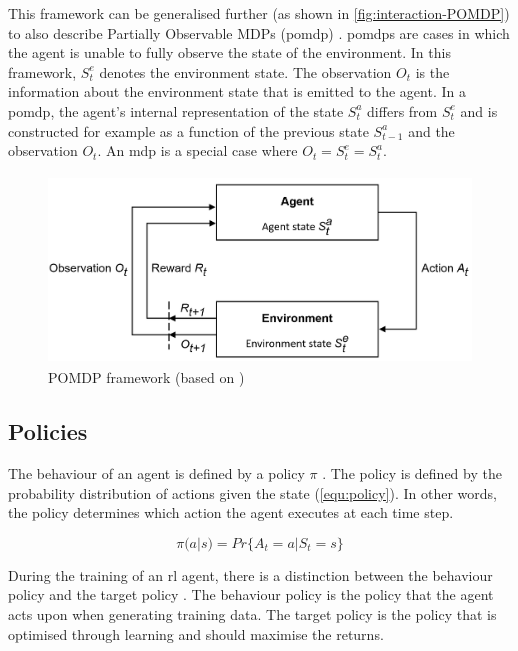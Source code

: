 This framework can be generalised further (as shown in \autoref{fig:interaction-POMDP}) to also describe Partially Observable MDPs (\gls{pomdp}) \parencite{silver2015}. \glspl{pomdp} are cases in which the agent is unable to fully observe the state of the environment.
In this framework, $S_t^e$ denotes the environment state. The observation $O_t$ is the information about the environment state that is emitted to the agent. In a \gls{pomdp}, the agent's internal representation of the state $S^a_t$ differs from $S_t^e$ and is constructed for example as a function of the previous state $S^a_{t-1}$ and the observation $O_t$. An \gls{mdp} is a special case where $O_t=S_t^e=S^a_t$.

\begin{figure}[H]
\centering
\includegraphics[height=5cm]{img/agent-env_POMDP.png}
\caption{POMDP framework (based on \textcite{silver2015})}
\label{fig:interaction-POMDP}
\end{figure}

\subsection{Policies}

The behaviour of an agent is defined by a policy $\pi$
\parencite{SuttonBarto_2018}. The policy is defined by the probability distribution of actions given the state (\autoref{equ:policy}). In other words, the policy determines which action the agent executes at each time step.

\begin{equation}
\label{equ:policy}
\pi(a|s) = Pr\lbrace A_t=a | S_t = s\rbrace
\end{equation}


During the training of an \gls{rl} agent, there is a distinction between the behaviour policy and the target policy \parencite{Wang_2022}. The behaviour policy is the policy that the agent acts upon when generating training data. The target policy is the policy that is optimised through learning and should maximise the returns. 

